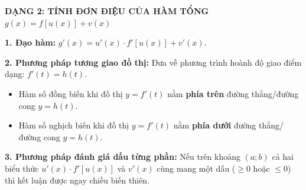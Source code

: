 \documentclass[12pt, a4paper]{article}
\begin{document}
\newpage
\begin{theorybox}
    \textbf{\textcolor{deepblue}{\large DẠNG 2: TÍNH ĐƠN ĐIỆU CỦA HÀM TỔNG $g(x) = f[u(x)] + v(x)$}}
    \par\vspace{0.15cm}
    \textbf{1. Đạo hàm:} $g'(x) = u'(x) \cdot f'[u(x)] + v'(x)$.
    \par\vspace{0.1cm}
    \textbf{2. Phương pháp tương giao đồ thị:}
    Đưa về phương trình hoành độ giao điểm dạng: $f'(t) = h(t)$.
    \begin{itemize}
        \item Hàm số đồng biến khi đồ thị $y = f'(t)$ nằm \textbf{phía trên} đường thẳng/đường cong $y = h(t)$.
        \item Hàm số nghịch biến khi đồ thị $y = f'(t)$ nằm \textbf{phía dưới} đường thẳng/đường cong $y = h(t)$.
    \end{itemize}
    \textbf{3. Phương pháp đánh giá dấu từng phần:}
    Nếu trên khoảng $(a; b)$ cả hai biểu thức $u'(x) \cdot f'[u(x)]$ và $v'(x)$ cùng mang một dấu ($\ge 0$ hoặc $\le 0$) thì kết luận được ngay chiều biến thiên.
\end{theorybox}
\end{document}
